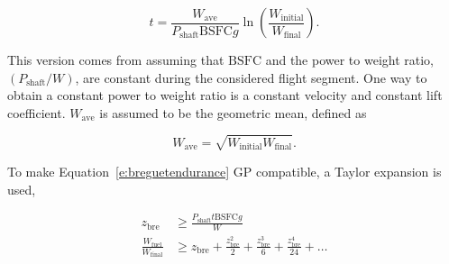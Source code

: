 \begin{equation}
    \label{e:breguetendurance}
    t = \frac{W_{\text{ave}}}{P_{\text{shaft}}\text{BSFC}g} \ln{\left( \frac{W_{\text{initial}}}{W_{\text{final}}}\right)}.
\end{equation}

%
% 
% 
% 
% 

This version comes from assuming that $\text{BSFC}$ and the power to weight ratio, $(P_{\text{shaft}}/W)$, are constant during the considered flight segment. 
One way to obtain a constant power to weight ratio is a constant velocity and constant lift coefficient.\cite{br2}
$W_{\text{ave}}$ is assumed to be the geometric mean, defined as

% 
% 
% 
% 

\begin{equation}
    \label{e:gpmean}
    W_{\text{ave}} = \sqrt{W_{\text{initial}}W_{\text{final}}}.
\end{equation}

    To make Equation~\eqref{e:breguetendurance} GP compatible, a Taylor expansion is used,\cite{hoburgthesis}

\begin{align}
    \label{e:brzbre}
    z_{\text{bre}} &\geq \frac{P_{\text{shaft}}t \text{BSFC} g}{W}\\
    \label{e:brtaylor}
    \frac{W_{\text{fuel}}}{W_\text{final}} &\geq z_{\text{bre}} + \frac{z_{\text{bre}}^2}{2} + \frac{z_{\text{bre}}^3}{6} + \frac{z_{\text{bre}}^4}{24} + \dots
\end{align}

